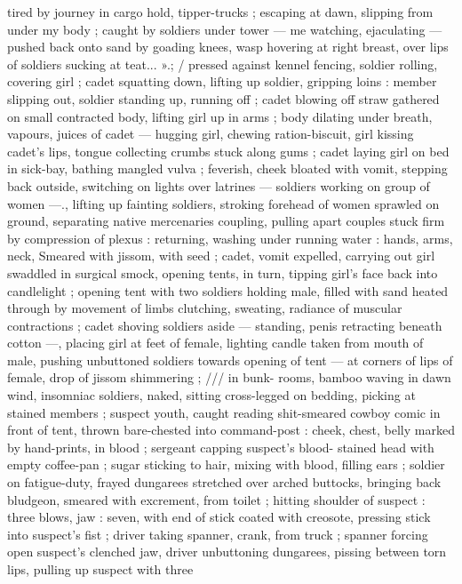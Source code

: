 tired by journey in cargo hold, tipper-trucks ; escaping at dawn,
slipping from under my body ; caught by soldiers under tower --- me
watching, ejaculating --- pushed back onto sand by goading knees,
wasp hovering at right breast, over lips of soldiers sucking at teat...
».; / pressed against kennel fencing, soldier rolling, covering girl ;
cadet squatting down, lifting up soldier, gripping loins : member
slipping out, soldier standing up, running off ; cadet blowing off
straw gathered on small contracted body, lifting girl up in arms ; body
dilating under breath, vapours, juices of cadet --- hugging girl,
chewing ration-biscuit, girl kissing cadet's lips, tongue collecting
crumbs stuck along gums ; cadet laying girl on bed in sick-bay,
bathing mangled vulva ; feverish, cheek bloated with vomit, stepping
back outside, switching on lights over latrines --- soldiers working on
group of women ---., lifting up fainting soldiers, stroking forehead of
women sprawled on ground, separating native mercenaries coupling,
pulling apart couples stuck firm by compression of plexus :
returning, washing under running water : hands, arms, neck,
Smeared with jissom, with seed ; cadet, vomit expelled, carrying out
girl swaddled in surgical smock, opening tents, in turn, tipping girl's
face back into candlelight ; opening tent with two soldiers holding
male, filled with sand heated through by movement of limbs
clutching, sweating, radiance of muscular contractions ; cadet
shoving soldiers aside --- standing, penis retracting beneath cotton
---, placing girl at feet of female, lighting candle taken from mouth %
of male, pushing unbuttoned soldiers towards opening of tent --- at
corners of lips of female, drop of jissom shimmering ; /// in bunk-
rooms, bamboo waving in dawn wind, insomniac soldiers, naked,
sitting cross-legged on bedding, picking at stained members ;
suspect youth, caught reading shit-smeared cowboy comic in front of
tent, thrown bare-chested into command-post : cheek, chest, belly
marked by hand-prints, in blood ; sergeant capping suspect's blood-
stained head with empty coffee-pan ; sugar sticking to hair, mixing
with blood, filling ears ; soldier on fatigue-duty, frayed dungarees
stretched over arched buttocks, bringing back bludgeon, smeared
with excrement, from toilet ; hitting shoulder of suspect : three
blows, jaw : seven, with end of stick coated with creosote, pressing
stick into suspect's fist ; driver taking spanner, crank, from truck ;
spanner forcing open suspect's clenched jaw, driver unbuttoning
dungarees, pissing between torn lips, pulling up suspect with three
